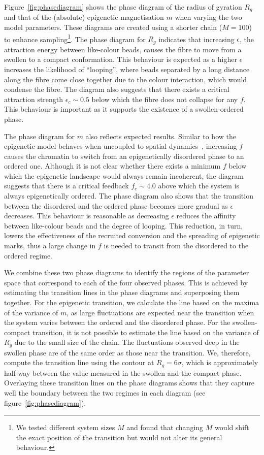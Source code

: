 \documentclass[12pt]{article}
\begin{document}
Figure~\ref{fig:phasediagram} shows the phase diagram of the radius of gyration $R_g$ and that of the (absolute) epigenetic magnetisation $m$ when varying the two model parameters. These diagrams are created using a shorter chain ($M = 100$) to enhance sampling\footnote{We tested different system sizes $M$ and found that changing $M$ would shift the exact position of the transition but would not alter its general behaviour.}. The phase diagram for $R_g$ indicates that increasing $\epsilon$, the attraction energy between like-colour beads, causes the fibre to move from a swollen to a compact conformation. This behaviour is expected as a higher $\epsilon$ increases the likelihood of ``looping'', where beads separated by a long distance along the fibre come close together due to the colour interaction, which would condense the fibre. The diagram also suggests that there exists a critical attraction strength $\epsilon_c \sim 0.5$ below which the fibre does not collapse for any $f$. This behaviour is important as it supports the existence of a swollen-ordered phase. 

The phase diagram for $m$ also reflects expected results. Similar to how the epigenetic model behaves when uncoupled to spatial dynamics~\cite{dodd2007}, increasing $f$ causes the chromatin to switch from an epigenetically disordered phase to an ordered one. Although it is not clear whether there exists a minimum $f$ below which the epigenetic landscape would always remain incoherent, the diagram suggests that there is a critical feedback $f_c \sim 4.0$  above which the system is always epigenetically ordered. The phase diagram also shows that the transition between the disordered and the ordered phase becomes more gradual as $\epsilon$ decreases. This behaviour is reasonable as decreasing $\epsilon$ reduces the affinity between like-colour beads and the degree of looping. This reduction, in turn, lowers the effectiveness of the recruited conversion and the spreading of epigenetic marks, thus a large change in $f$ is needed to transit from the disordered to the ordered regime.

We combine these two phase diagrams to identify the regions of the parameter space that correspond to each of the four observed phases. This is achieved by estimating the transition lines in the phase diagrams and superposing them together. For the epigenetic transition, we calculate the line based on the maxima of the variance of $m$, as large fluctuations are expected near the transition when the system varies between the ordered and the disordered phase. For the swollen-compact transition, it is not possible to estimate the line based on the variance of $R_g$ due to the small size of the chain. The fluctuations observed deep in the swollen phase are of the same order as those near the transition. We, therefore, compute the transition line using the contour at $R_g  = 6\sigma$, which is approximately half-way between the value measured in the swollen and the compact phase. Overlaying these transition lines on the phase diagrams shows that they capture well the boundary between the two regimes in each diagram (see figure~\ref{fig:phasediagram}).
\end{document}
